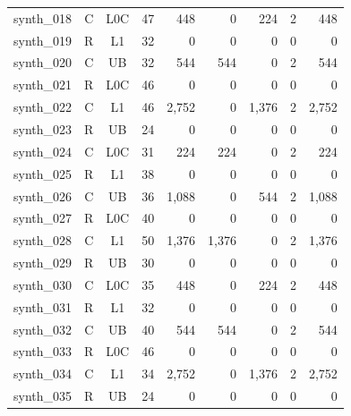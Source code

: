 \begin{longtable}{lccrrrrrr}
synth\_018 & C & L0C & 47 & 448 & 0 & 224 & 2 & 448 \\
synth\_019 & R & L1 & 32 & 0 & 0 & 0 & 0 & 0 \\
synth\_020 & C & UB & 32 & 544 & 544 & 0 & 2 & 544 \\
synth\_021 & R & L0C & 46 & 0 & 0 & 0 & 0 & 0 \\
synth\_022 & C & L1 & 46 & 2,752 & 0 & 1,376 & 2 & 2,752 \\
synth\_023 & R & UB & 24 & 0 & 0 & 0 & 0 & 0 \\
synth\_024 & C & L0C & 31 & 224 & 224 & 0 & 2 & 224 \\
synth\_025 & R & L1 & 38 & 0 & 0 & 0 & 0 & 0 \\
synth\_026 & C & UB & 36 & 1,088 & 0 & 544 & 2 & 1,088 \\
synth\_027 & R & L0C & 40 & 0 & 0 & 0 & 0 & 0 \\
synth\_028 & C & L1 & 50 & 1,376 & 1,376 & 0 & 2 & 1,376 \\
synth\_029 & R & UB & 30 & 0 & 0 & 0 & 0 & 0 \\
synth\_030 & C & L0C & 35 & 448 & 0 & 224 & 2 & 448 \\
synth\_031 & R & L1 & 32 & 0 & 0 & 0 & 0 & 0 \\
synth\_032 & C & UB & 40 & 544 & 544 & 0 & 2 & 544 \\
synth\_033 & R & L0C & 46 & 0 & 0 & 0 & 0 & 0 \\
synth\_034 & C & L1 & 34 & 2,752 & 0 & 1,376 & 2 & 2,752 \\
synth\_035 & R & UB & 24 & 0 & 0 & 0 & 0 & 0 \\
\end{longtable}
